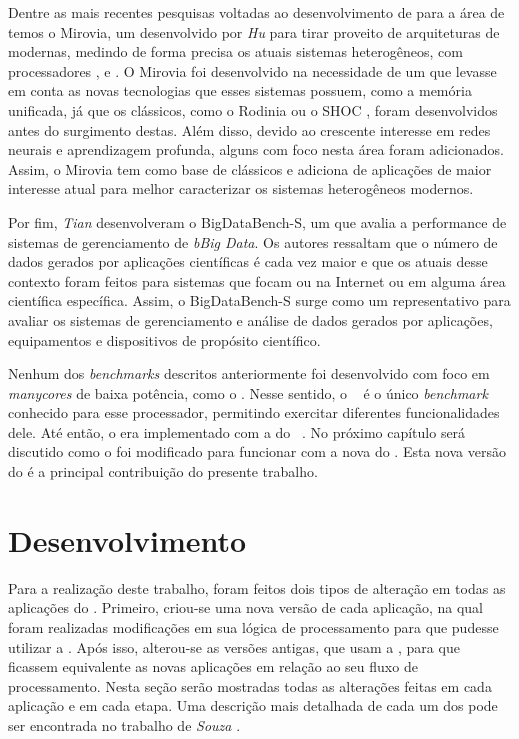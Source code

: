 Dentre as mais recentes pesquisas voltadas ao desenvolvimento de \benchs para a área de \HPC temos o Mirovia, um \bench desenvolvido por \textit{Hu} \etal \cite{miroviabenchmark} para tirar proveito de arquiteturas de \GPUs modernas, medindo de forma precisa os atuais sistemas heterogêneos, com processadores \multicore, \manycore e \GPUs. O Mirovia foi desenvolvido na necessidade de um \bench que levasse em conta as novas tecnologias que esses sistemas possuem, como a memória unificada, já que os \benchs clássicos, como o Rodinia \cite{rodiniabench} ou o SHOC \cite{shocbench}, foram desenvolvidos antes do surgimento destas. Além disso, devido ao crescente interesse em redes neurais e aprendizagem profunda, alguns  com foco nesta área foram adicionados. Assim, o Mirovia tem como base  de \benchs clássicos e adiciona  de aplicações de maior interesse atual para melhor caracterizar os sistemas heterogêneos modernos.

Por fim, \textit{Tian} \etal \cite{tianbench} desenvolveram o BigDataBench-S, um \bench que avalia a performance de sistemas de gerenciamento de \textit{bBig Data}. Os autores ressaltam que o número de dados gerados por aplicações científicas é cada vez maior e que os atuais \benchs desse contexto foram feitos para sistemas que focam ou na Internet ou em alguma área científica específica. Assim, o BigDataBench-S surge como um \bench representativo para avaliar os sistemas de gerenciamento e análise de dados gerados por aplicações, equipamentos e dispositivos de propósito científico.

Nenhum dos \textit{benchmarks} descritos anteriormente foi desenvolvido com foco em \textit{manycores} de baixa potência, como o \mppa. Nesse sentido, o \capb~\cite{Castro-Souza-CCPE:2016} é o único \textit{benchmark} conhecido para esse processador, permitindo exercitar diferentes funcionalidades dele. Até então, o \capb era implementado com a \API \IPC do \mppa~\cite{mppa2562013}. No próximo capítulo será discutido como o \capb foi modificado para funcionar com a nova \API \ASYNC do \mppa. Esta nova versão do \capb é a principal contribuição do presente trabalho.

\chapter{Desenvolvimento}
\label{ch:desenvolvimento}

Para a realização deste trabalho, foram feitos dois tipos de alteração em todas as aplicações do \capb. Primeiro, criou-se uma nova versão de cada aplicação, na qual foram realizadas modificações em sua lógica de processamento para que pudesse utilizar a \API \ASYNC. Após isso, alterou-se as versões antigas, que usam a \API \IPC, para que ficassem equivalente as novas aplicações em relação ao seu fluxo de processamento. Nesta seção serão mostradas todas as alterações feitas em cada aplicação e em cada etapa. Uma descrição mais detalhada de cada um dos  pode ser encontrada no trabalho de \textit{Souza} \etal \cite{Castro-Souza-CCPE:2016}.

